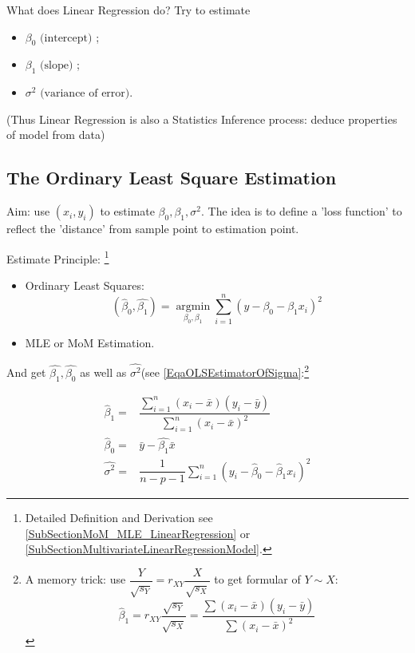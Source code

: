     What does Linear Regression do? Try to estimate 
    \begin{itemize}[topsep=0pt,itemsep=-2pt]
        \item $ \beta _0\text{ (intercept) }$;
        \item $\beta _1\text{ (slope) }$;
        \item $\sigma ^2\text{ (variance of error)} $.
    \end{itemize}
    
    
    (Thus Linear Regression is also a Statistics Inference process: deduce properties of model from data)
        
\subsection{The Ordinary Least Square Estimation}
    Aim: use $ (x_i,y_i) $  to estimate $ \beta _0,\beta _1,\sigma^2 $. The idea is to define a 'loss function' to reflect the 'distance' from sample point to estimation point.

    Estimate Principle: \footnote{Detailed Definition and Derivation see \autoref{SubSectionMoM_MLE_LinearRegression} or \autoref{SubSectionMultivariateLinearRegressionModel}.}
    \begin{itemize}[topsep=2pt,itemsep=2pt]
        \item Ordinary Least Squares:
        \begin{equation}
            (\hat{\beta  }_0,\hat{\beta _1})=\mathop{ \arg\min }\limits_{\beta _0,\beta _1} \sum_{i=1}^n (y-\beta _0-\beta _1x_i)^2
        \end{equation}
        \item MLE or MoM Estimation.
    \end{itemize}
    

    
    And get $ \hat{\beta _1},\hat{\beta _0}$ as well as $ \hat{\sigma^2} $(see \autoref{EqaOLSEstimatorOfSigma}:\footnote{A memory trick: use $ \dfrac{Y}{\sqrt{s_Y}}=r_{XY}\dfrac{X}{\sqrt{s_X}} $ to get formular of $ Y\sim X $:
    \begin{equation}
        \hat{\beta }_1=r_{XY}\dfrac{\sqrt{s_Y}}{\sqrt{s_X}}=\dfrac{{\displaystyle\sum (x_i-\bar{x})(y_i-\bar{y})}}{{\displaystyle\sum (x_i-\bar{x})^2}} 
    \end{equation}}

\begin{equation}\label{EqaOLSEstimatorOfBeta}
    \begin{aligned}
        \hat{\beta }_1=&\dfrac{\sum\limits_{i=1}^n (x_i-\bar{x})(y_i-\bar{y})}{\sum\limits_{i=1}^n (x_i-\bar{x})^2}\\
        \hat{\beta }_0=&\bar{y}-\hat{\beta _1}\bar{x}\\
        \hat{\sigma^2}=&\dfrac{1}{n-p-1}\sum_{i=1}^n(y_i-\hat{\beta }_0-\hat{\beta }_1x_i)^2
    \end{aligned}
\end{equation}


